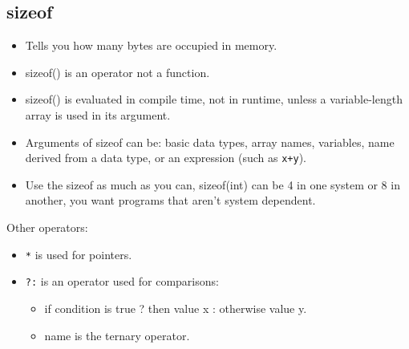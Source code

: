 \subsection{sizeof}
\begin{itemize}
    \item Tells you how many bytes are occupied in memory. 
    \item sizeof() is an operator not a function. 
    \item sizeof() is evaluated in compile time, not in runtime, unless a variable-length array is used in its argument. 
    \item Arguments of sizeof can be: basic data types, array names, variables, name derived from a data type, or an expression (such as \texttt{x+y}). 
    \item Use the sizeof as much as you can, sizeof(int) can be 4 in one system or 8 in another, you want programs that aren't system dependent. 
\end{itemize}
Other operators: 
\begin{itemize}
    \item \texttt{*} is used for pointers. 
    \item \texttt{?:} is an operator used for comparisons: 
        \begin{itemize}
            \item if condition is true ? then value x : otherwise value y.
            \item name is the ternary operator. 
        \end{itemize}
\end{itemize}



